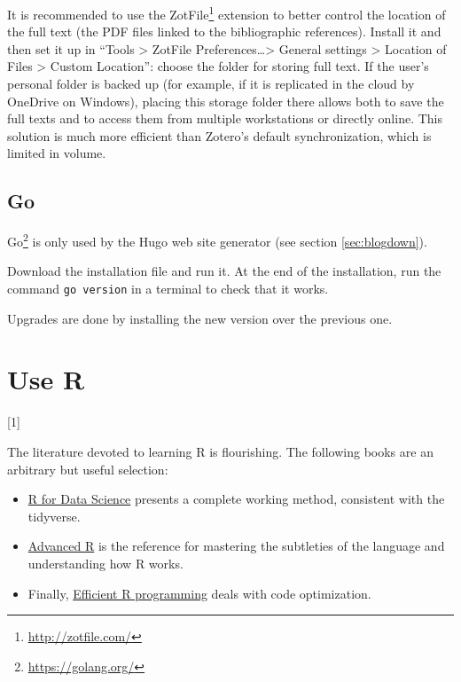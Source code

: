 \documentclass[
  12pt,
  american,
  a4paper,
  extrafontsizes,onecolumn,openright
  ]{memoir}
\providecommand{\tightlist}{%
  \setlength{\itemsep}{0pt}\setlength{\parskip}{0pt}}
\newcommand{\toc}[1]{%
  \startcontents[chapters]%
  \printcontents[chapters]{}{1}[#1]{}%
  ~\newline%
}
\begin{document}
It is recommended to use the ZotFile\footnote{\url{http://zotfile.com/}} extension to better control the location of the full text (the PDF files linked to the bibliographic references).
Install it and then set it up in \enquote{Tools \textgreater{} ZotFile Preferences\ldots\textgreater{} General settings \textgreater{} Location of Files \textgreater{} Custom Location}: choose the folder for storing full text.
If the user's personal folder is backed up (for example, if it is replicated in the cloud by OneDrive on Windows), placing this storage folder there allows both to save the full texts and to access them from multiple workstations or directly online.
This solution is much more efficient than Zotero's default synchronization, which is limited in volume.

\section{Go}\label{go}

Go\footnote{\url{https://golang.org/}} is only used by the Hugo web site generator (see section \ref{sec:blogdown}).

Download the installation file and run it.
At the end of the installation, run the command \texttt{go\ version} in a terminal to check that it works.

Upgrades are done by installing the new version over the previous one.

\chapter{Use R}\label{chap-utiliseR}

\toc{1}

The literature devoted to learning R is flourishing.
The following books are an arbitrary but useful selection:

\begin{itemize}
\tightlist
\item
  \href{https://r4ds.had.co.nz/}{R for Data Science} \autocite{Wickham2016} presents a complete working method, consistent with the tidyverse.
\item
  \href{http://adv-r.had.co.nz/}{Advanced R} \autocite{Wickham2014} is the reference for mastering the subtleties of the language and understanding how R works.
\item
  Finally, \href{https://csgillespie.github.io/efficientR/}{Efficient R programming} \autocite{Gillespie2016} deals with code optimization.
\end{itemize}
\end{document}

